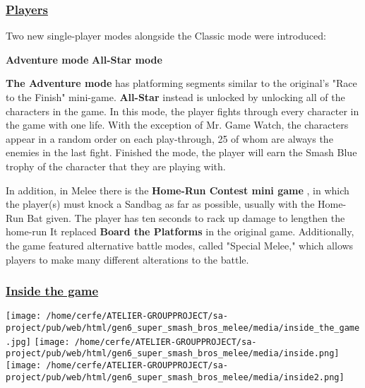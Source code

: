 \documentclass[a4paper,10pt]{book}
\begin{document}
 \subsubsection{\underline{Players }}
 
          Two new single-player modes alongside the Classic mode were introduced:
         
 
 \textbf{Adventure mode } 
 \textbf{All-Star mode } 
 
 
 \textbf{ The Adventure mode }  has platforming segments similar to the original's "Race to the Finish" mini-game.  
 \textbf{All-Star }  instead  is unlocked by unlocking all of the characters in the game. In this mode, the player fights through every character in the game with one life.
          With the exception of Mr. Game  Watch, the characters appear in a random order on each play-through, 25 of whom are always the enemies in the last fight.
          Finished the mode, the player will earn the Smash Blue trophy of the character that they are playing with.
           
          In addition, in Melee there is the  \textbf{Home-Run Contest mini game  } , in which the player(s) must knock a Sandbag as far as possible, usually with the Home-Run Bat given. The player has ten seconds to rack up damage to lengthen the home-run
          It replaced  \textbf{Board the Platforms }  in the original game. 
          Additionally, the game featured alternative battle modes, called "Special Melee," which allows players to make many
          different alterations to the battle.
         
 \subsubsection{\underline{Inside the game }}
 \texttt{[image: /home/cerfe/ATELIER-GROUPPROJECT/sa-project/pub/web/html/gen6\_super\_smash\_bros\_melee/media/inside\_the\_game.jpg]}
 \texttt{[image: /home/cerfe/ATELIER-GROUPPROJECT/sa-project/pub/web/html/gen6\_super\_smash\_bros\_melee/media/inside.png]}
 \texttt{[image: /home/cerfe/ATELIER-GROUPPROJECT/sa-project/pub/web/html/gen6\_super\_smash\_bros\_melee/media/inside2.png]}
\end{document}
